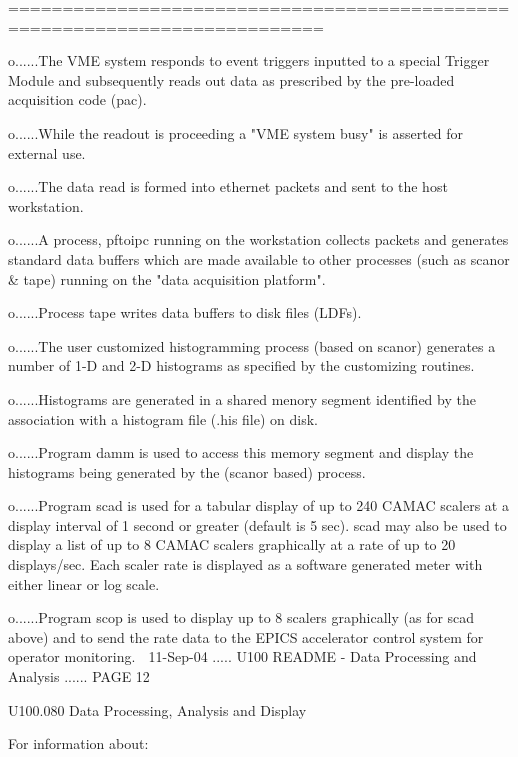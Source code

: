    ===========================================================================
 
 
   o......The  VME  system  responds  to  event triggers inputted to a special
          Trigger Module and subsequently reads out data as prescribed by  the
          pre-loaded acquisition code (pac).
 
   o......While  the readout is proceeding a "VME system busy" is asserted for
          external use.
 
   o......The data read is formed into ethernet packets and sent to  the  host
          workstation.
 
   o......A  process, pftoipc  running on the workstation collects packets and
          generates standard data buffers which are made  available  to  other
          processes  (such  as scanor & tape) running on the "data acquisition
          platform".
 
   o......Process tape writes data buffers to disk files (LDFs).
 
   o......The   user   customized  histogramming  process  (based  on  scanor)
          generates a number of 1-D and 2-D histograms  as  specified  by  the
          customizing routines.
 
   o......Histograms  are  generated  in a shared menory segment identified by
          the association with a histogram file (.his file) on disk.
 
   o......Program damm is used to access this memory segment and  display  the
          histograms being generated by the (scanor based) process.
 
   o......Program  scad  is  used  for  a  tabular display of up to 240  CAMAC
          scalers at a display interval of 1 second or greater (default  is  5
          sec).  scad  may  also  be  used  to display a list of up to 8 CAMAC
          scalers graphically at a rate of up to 20 displays/sec. Each  scaler
          rate  is  displayed as a software generated meter with either linear
          or log scale.
 
   o......Program scop is used to display up to 8 scalers graphically (as  for
          scad  above)  and  to  send  the  rate data to the EPICS accelerator
          control system for operator monitoring.
    
   11-Sep-04 ..... U100  README - Data Processing and Analysis ...... PAGE  12
 
 
   U100.080  Data Processing, Analysis and Display
 
 
   For information about:
 

